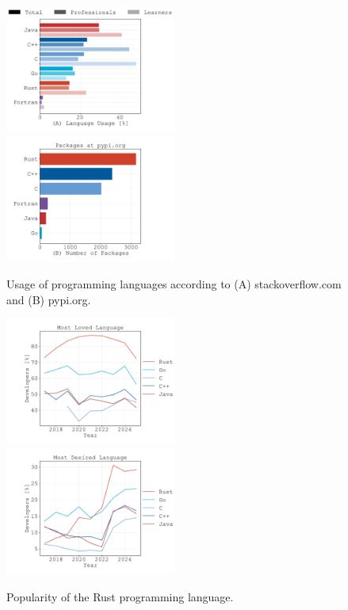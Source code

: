 \documentclass{article}
\begin{document}
\begin{figure}
    \centering
    \includegraphics[width=0.5\textwidth]{figures/stackoverflow-popular-languages.pdf}%
    \includegraphics[width=0.5\textwidth]{figures/pypi-org-used-languages.pdf}
    \caption{
        Usage of programming languages according to (A) stackoverflow.com and (B) pypi.org.
    }
\end{figure}
\begin{figure}
    \centering
    \includegraphics[width=0.5\textwidth]{figures/stackoverflow-loved-language.pdf}%
    \includegraphics[width=0.5\textwidth]{figures/stackoverflow-desired-language.pdf}
    \caption{
        Popularity of the Rust programming language.
    }
\end{figure}
\end{document}
